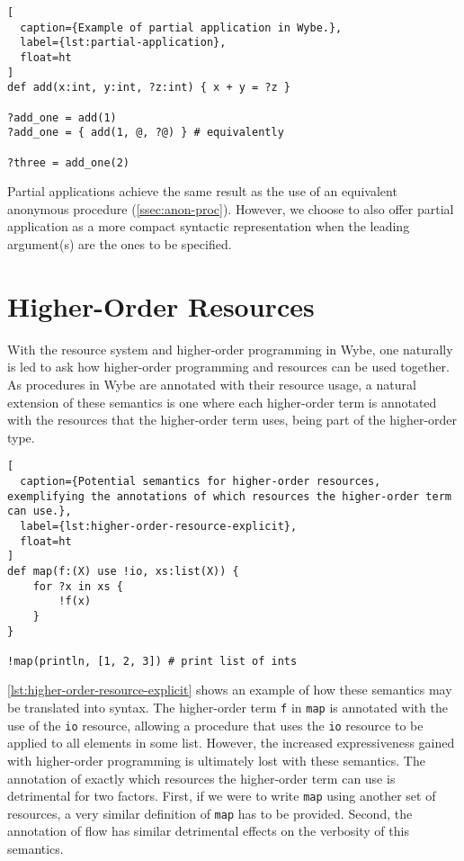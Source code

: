 \begin{lstlisting}[
  caption={Example of partial application in Wybe.},
  label={lst:partial-application},
  float=ht
]
def add(x:int, y:int, ?z:int) { x + y = ?z }

?add_one = add(1)
?add_one = { add(1, @, ?@) } # equivalently

?three = add_one(2)
\end{lstlisting}

Partial applications achieve the same result as the use of an equivalent anonymous procedure (\cref{ssec:anon-proc}). However, we choose to also offer partial application as a more compact syntactic representation when the leading argument(s) are the ones to be specified.

\section{Higher-Order Resources}
\label{sec:ss-higher-order-resources}

With the resource system and higher-order programming in Wybe, one naturally is led to ask how higher-order programming and resources can be used together. As procedures in Wybe are annotated with their resource usage, a natural extension of these semantics is one where each higher-order term is annotated with the resources that the higher-order term uses, being part of the higher-order type. 

\begin{lstlisting}[
  caption={Potential semantics for higher-order resources, exemplifying the annotations of which resources the higher-order term can use.},
  label={lst:higher-order-resource-explicit},
  float=ht
]
def map(f:(X) use !io, xs:list(X)) {
    for ?x in xs {
        !f(x)
    }
}

!map(println, [1, 2, 3]) # print list of ints
\end{lstlisting}

\cref{lst:higher-order-resource-explicit} shows an example of how these semantics may be translated into syntax. The higher-order term \texttt{f} in \texttt{map} is annotated with the use of the \texttt{io} resource, allowing a procedure that uses the \texttt{io} resource to be applied to all elements in some list. However, the increased expressiveness gained with higher-order programming is ultimately lost with these semantics. The annotation of exactly which resources the higher-order term can use is detrimental for two factors. First, if we were to write \texttt{map} using another set of resources, a very similar definition of \texttt{map} has to be provided. Second, the annotation of flow has similar detrimental effects on the verbosity of this semantics.

